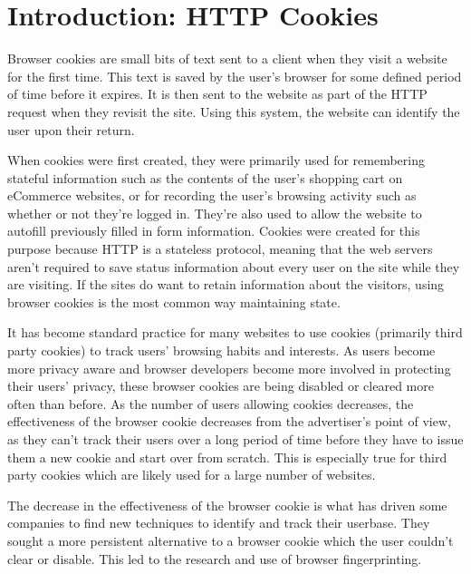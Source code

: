 \chapter{Introduction: HTTP Cookies}

Browser cookies are small bits of text sent to a client when they visit a website for the first time.
This text is saved by the user's browser for some defined period of time before it expires.
It is then sent to the website as part of the HTTP request when they revisit the site.
Using this system, the website can identify the user upon their return.

When cookies were first created, they were primarily used for remembering stateful information such as the contents of the user's shopping cart on eCommerce websites, or for recording the user's browsing activity such as whether or not they're logged in.
They're also used to allow the website to autofill previously filled in form information.
Cookies were created for this purpose because HTTP is a stateless protocol, meaning that the web servers aren't required to save status information about every user on the site while they are visiting.
If the sites do want to retain information about the visitors, using browser cookies is the most common way maintaining state.

It has become standard practice for many websites to use cookies (primarily third party cookies) to track users' browsing habits and interests.
As users become more privacy aware and browser developers become more involved in protecting their users' privacy, these browser cookies are being disabled or cleared more often than before.
As the number of users allowing cookies decreases, the effectiveness of the browser cookie decreases from the advertiser's point of view, as they can't track their users over a long period of time before they have to issue them a new cookie and start over from scratch.
This is especially true for third party cookies which are likely used for a large number of websites.

The decrease in the effectiveness of the browser cookie is what has driven some companies to find new techniques to identify and track their userbase.
They sought a more persistent alternative to a browser cookie which the user couldn't clear or disable.
This led to the research and use of browser fingerprinting.

